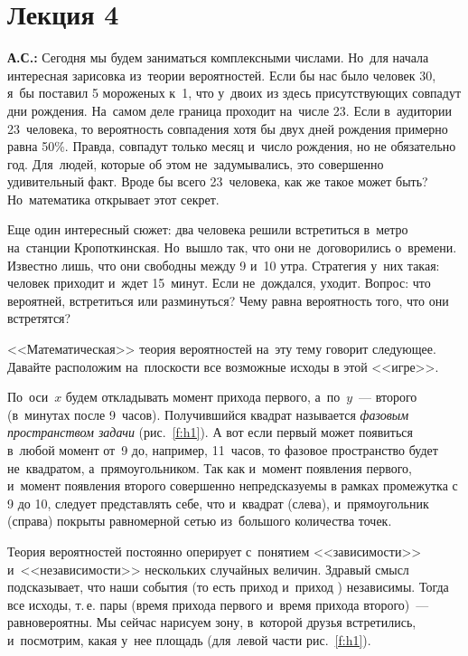 \section{Лекция 4}
\label{2.4}

\textbf{А.С.:}
Сегодня мы будем заниматься комплексными числами. Но~для начала интересная зарисовка из~теории
вероятностей. Если бы нас было человек 30, я~бы поставил 5 мороженых к~1, что у~двоих из здесь
присутствующих совпадут дни рождения. На~самом деле граница проходит на~числе 23. Если
в~аудитории 23~человека, то вероятность совпадения хотя бы двух дней рождения примерно равна 50\%. Правда,
совпадут только месяц и~число рождения, но не обязательно год. Для~людей, которые об этом не~задумывались, это совершенно
удивительный факт. Вроде бы всего 23~человека, как же такое может быть?
 Но~математика открывает
этот секрет.

Еще один интересный сюжет: два человека решили встретиться в~метро на~станции Кропоткинская.
Но~вышло так, что они не~договорились о~времени. Известно лишь, что они свободны между 9 и~10 утра.
Стратегия у~них такая: человек приходит и~ждет 15~минут. Если не~дождался, уходит.
Вопрос: что вероятней, встретиться или разминуться? Чему равна вероятность того, что они встретятся?

<<Математическая>> теория вероятностей на~эту тему говорит следующее. Давайте расположим на~плоскости все возможные исходы в этой <<игре>>.


По~оси~$x$ будем откладывать момент прихода первого, а~по~$y$~--- второго (в~минутах после 9~часов).
Получившийся квадрат называется \textit{фазовым пространством задачи} (рис.~\ref{f:h1}).
А вот если первый может появиться в~любой момент от~9 до, например,
11~часов, то фазовое пространство будет не~квадратом, а~прямоугольником. Так
как и~момент появления первого, и~момент появления второго совершенно непредсказуемы в рамках промежутка с 9 до 10,
следует представлять себе, что и~квадрат (слева), и~прямоугольник (справа) покрыты равномерной сетью
из~большого количества точек.


Теория вероятностей постоянно оперирует с~понятием <<зависимости>> и~<<независимости>> нескольких
случайных величин. Здравый смысл подсказывает, что наши события (то есть приход 
и~приход ) независимы. Тогда все исходы, т.\,е. пары (время прихода первого и~время
прихода второго)~--- равновероятны. Мы сейчас нарисуем зону, в~которой друзья встретились,
и~посмотрим, какая у~нее площадь (для~левой части рис.~\ref{f:h1}).

